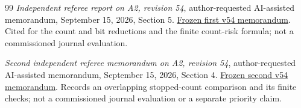 \begin{thebibliography}{99}
\emph{Independent referee report on A2, revision 54},
author-requested AI-assisted memorandum, September 15, 2026, Section 5.
\href{https://github.com/TrillionniumFoundation/theta-theory/blob/1030ca91a96ca1be8ecd0347ecbdac7084cdd8d4/reviews/a2-v54-independent-harsh-top4-2026-09-15/REFEREE_REPORT.md}{Frozen first v54 memorandum}.
Cited for the count and bit reductions and the finite count-risk formula;
not a commissioned journal evaluation.

\emph{Second independent referee memorandum on A2, revision 54},
author-requested AI-assisted memorandum, September 15, 2026, Section 4.
\href{https://github.com/TrillionniumFoundation/theta-theory/blob/67250d08714acf76274e82158f107246f0de7eee/reviews/a2-v54-second-referee-top4-2026-09-15/REFEREE_REPORT.md}{Frozen second v54 memorandum}.
Records an overlapping stopped-count comparison and its finite checks;
not a commissioned journal evaluation or a separate priority claim.

\end{thebibliography}
